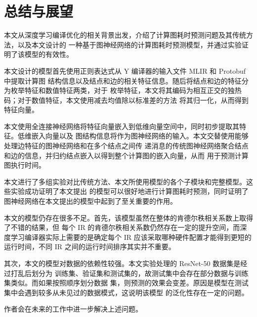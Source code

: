 
\chapter{总结与展望}
本文从深度学习编译优化的相关背景出发，介绍了计算图耗时预测问题及其传统方法，以及本文设计的
一种基于图神经网络的计算图耗时预测模型，并通过实验证明了该模型的有效性。

本文设计的模型首先使用正则表达式从 Y 编译器的输入文件 MLIR 和 Protobuf 中提取计算图
结构信息以及结点和边的相关特征信息。随后将结点和边的特征分为枚举特征和数值特征两类，对于
枚举特征，本文将其编码为相互正交的独热码；对于数值特征，本文使用减去均值除以标准差的方法
将其归一化，从而得到特征向量。

本文使用全连接神经网络将特征向量嵌入到低维向量空间中，同时初步提取其特征。低维嵌入向量以及
图结构信息将作为图神经网络的输入。本文交替使用能够处理边特征的图神经网络和在多个结点之间传
递消息的传统图神经网络聚合结点和边的信息，并归约结点嵌入以得到整个计算图的嵌入向量，从而
用于预测计算图执行时间。

本文进行了多组实验对比传统方法、本文所使用模型的各个子模块和完整模型。这些实验成功证明了本文提出
的模型可以很好地进行计算图耗时预测，同时证明了图神经网络在本文提出的模型中起到了至关重要的作用。

本文的模型仍存在很多不足。首先，该模型虽然在整体的肯德尔秩相关系数上取得了不错的结果，但
每个 IR 的肯德尔秩相关系数仍然存在一定的提升空间，而深度学习编译器实际上需要的是确定每个
IR 应该采取哪种硬件配置才能得到更短的运行时间，不同 IR 之间的运行时间排序其实并不重要。

其次，本文的模型对数据的依赖性较强。本文实验处理的 ResNet-50 数据集是经过打乱后划分为
训练集、验证集和测试集的，故测试集中会存在部分数据与训练集类似。而如果按照顺序划分数据
集，则预测的效果会变差。原因是模型在测试集中会遇到较多从未见过的数据模式，这说明该模型
的泛化性存在一定的问题。

作者会在未来的工作中进一步解决上述问题。